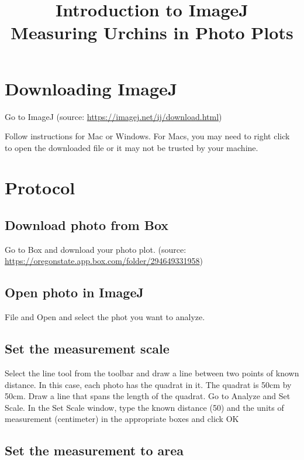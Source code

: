 \documentclass[12pt,letterpaper]{article}
\title{\textbf{Introduction to ImageJ}\\Measuring Urchins in Photo Plots}
\author{} %
\begin{document}
\maketitle

\tableofcontents

\pagebreak


\section{Downloading ImageJ}
\label{sec:download} %

Go to	{ImageJ (source: \url{https://imagej.net/ij/download.html})}

Follow instructions for Mac or Windows. For Macs, you may need to right click to open the downloaded file or it may not be trusted by your machine. 

\section{Protocol}

\subsection{Download photo from Box}

Go to Box and download your photo plot.	{(source: \url{https://oregonstate.app.box.com/folder/294649331958})}



\subsection{Open photo in ImageJ}

File and Open and select the phot you want to analyze. 



\subsection{Set the measurement scale}

Select the line tool from the toolbar and draw a line between two points of known distance. In this case, each photo has the quadrat in it. The quadrat is 50cm by 50cm. Draw a line that spans the length of the quadrat. Go to Analyze and Set Scale. In the Set Scale window, type the known distance (50) and the units of measurement (centimeter) in the appropriate boxes and click OK


\subsection{Set the measurement to area}
\end{document}
